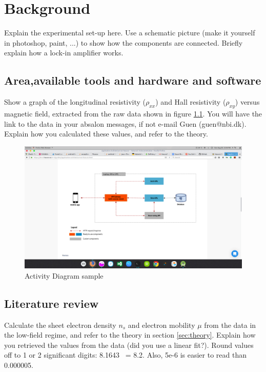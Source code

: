 \documentclass[a4paper]{report}
\begin{document}
    
    
    \chapter {Background}
    Explain the experimental set-up here. Use a schematic picture (make it yourself in photoshop, paint, ...) to show how the components are connected. Briefly explain how a lock-in amplifier works.
    
    \section{Area,available tools and hardware and software}
    Show a graph of the longitudinal resistivity ($\rho_{xx}$) and Hall resistivity ($\rho_{xy}$) versus magnetic field, extracted from the raw data shown in figure \ref{fig:data}. You will have the link to the data in your absalon messages, if not e-mail Guen (guen@nbi.dk). Explain how you calculated these values, and refer to the theory.
    
    \begin{figure}
    \centering
    \includegraphics[width=1\textwidth]{test.png}
    \caption{\label{fig:data} Activity Diagram sample}
    \end{figure}
    
    \section{Literature review}
    Calculate the sheet electron density $n_{s}$ and electron mobility $\mu$ from the data in the low-field regime, and refer to the theory in section \ref{sec:theory}. Explain how you retrieved the values from the data (did you use a linear fit?).
    Round values off to 1 or 2 significant digits: 8.1643 ~= 8.2. Also, 5e-6 is easier to read than 0.000005.
    
\end{document}
